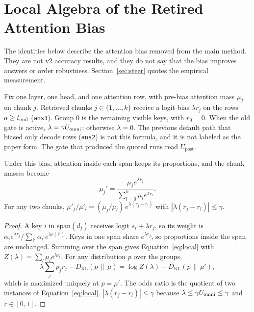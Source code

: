 \section{Local Algebra of the Retired Attention Bias}
\label{app:dca}
The identities below describe the attention bias removed from the main method.
They are not v2 accuracy results, and they do not say that the bias improves answers or order robustness.
Section~\ref{sec:steer} quotes the empirical measurement.

Fix one layer, one head, and one attention row, with pre-bias attention mass $\mu_j$ on chunk $j$.
Retrieved chunks $j\in\{1,\dots,k\}$ receive a logit bias $\lambda r_j$ on the rows $a\ge t_{\mathrm{end}}$ (\texttt{ans1}).
Group $0$ is the remaining visible keys, with $r_0=0$.
When the old gate is active, $\lambda=\gamma U_{\mathrm{omni}}$; otherwise $\lambda=0$.
The previous default path that biased only decode rows (\texttt{ans2}) is not this formula, and it is not labeled as the paper form.
The gate that produced the quoted runs read $U_{\mathrm{post}}$.

\begin{proposition}
\label{thm:tilt}
Under this bias, attention inside each span keeps its proportions, and the chunk masses become
\begin{equation}
\mu_j'=\frac{\mu_j e^{\lambda r_j}}{\sum_{l=0}^{k}\mu_l e^{\lambda r_l}}.
\label{eq:local}
\end{equation}
For any two chunks, $\mu'_j/\mu'_l=(\mu_j/\mu_l)\,e^{\lambda(r_j-r_l)}$ with $|\lambda(r_j-r_l)|\le\gamma$.
\end{proposition}

\begin{proof}
A key $i$ in $\mathrm{span}(d_j)$ receives logit $s_i+\lambda r_j$, so its weight is $\alpha_i e^{\lambda r_j}/\sum_{i'}\alpha_{i'}e^{\lambda r(i')}$.
Keys in one span share $e^{\lambda r_j}$, so proportions inside the span are unchanged.
Summing over the span gives Equation~\eqref{eq:local} with $Z(\lambda)=\sum_l\mu_l e^{\lambda r_l}$.
For any distribution $p$ over the groups,
\[
\lambda\sum_j p_j r_j-D_{\mathrm{KL}}(p\,\|\,\mu)
=\log Z(\lambda)-D_{\mathrm{KL}}(p\,\|\,\mu'),
\]
which is maximized uniquely at $p=\mu'$.
The odds ratio is the quotient of two instances of Equation~\eqref{eq:local}.
$|\lambda(r_j-r_l)|\le\gamma$ because $\lambda\le\gamma U_{\mathrm{omni}}\le\gamma$ and $r\in[0,1]$.
\end{proof}

